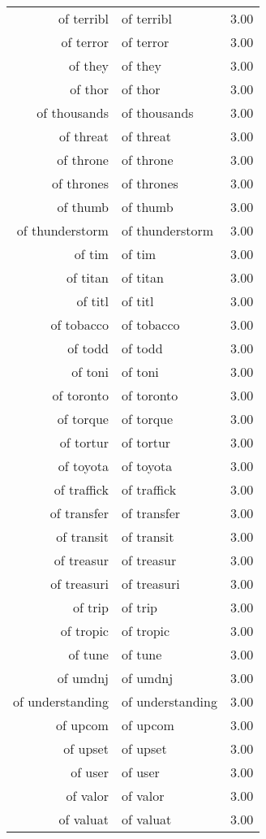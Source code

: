 \begin{table}[ht]
\begin{tabular}{rlr}
  of terribl & of terribl & 3.00 \\ 
  of terror & of terror & 3.00 \\ 
  of they & of they & 3.00 \\ 
  of thor & of thor & 3.00 \\ 
  of thousands & of thousands & 3.00 \\ 
  of threat & of threat & 3.00 \\ 
  of throne & of throne & 3.00 \\ 
  of thrones & of thrones & 3.00 \\ 
  of thumb & of thumb & 3.00 \\ 
  of thunderstorm & of thunderstorm & 3.00 \\ 
  of tim & of tim & 3.00 \\ 
  of titan & of titan & 3.00 \\ 
  of titl & of titl & 3.00 \\ 
  of tobacco & of tobacco & 3.00 \\ 
  of todd & of todd & 3.00 \\ 
  of toni & of toni & 3.00 \\ 
  of toronto & of toronto & 3.00 \\ 
  of torque & of torque & 3.00 \\ 
  of tortur & of tortur & 3.00 \\ 
  of toyota & of toyota & 3.00 \\ 
  of traffick & of traffick & 3.00 \\ 
  of transfer & of transfer & 3.00 \\ 
  of transit & of transit & 3.00 \\ 
  of treasur & of treasur & 3.00 \\ 
  of treasuri & of treasuri & 3.00 \\ 
  of trip & of trip & 3.00 \\ 
  of tropic & of tropic & 3.00 \\ 
  of tune & of tune & 3.00 \\ 
  of umdnj & of umdnj & 3.00 \\ 
  of understanding & of understanding & 3.00 \\ 
  of upcom & of upcom & 3.00 \\ 
  of upset & of upset & 3.00 \\ 
  of user & of user & 3.00 \\ 
  of valor & of valor & 3.00 \\ 
  of valuat & of valuat & 3.00 \\ 

\end{tabular}
\end{table}
